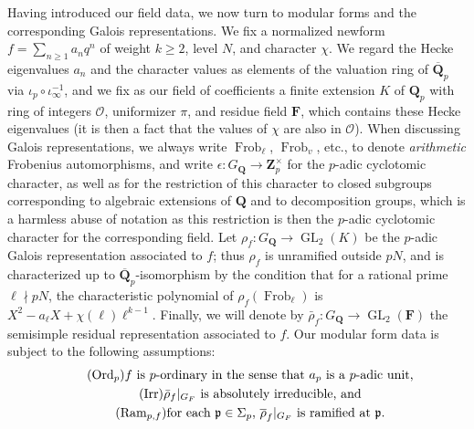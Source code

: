 \documentclass[12 pt]{amsart}
\theoremstyle{plain}
\theoremstyle{definition}
\numberwithin{equation}{section}
\numberwithin{table}{section}
\begin{document}
\indent Having introduced our field data, we now turn to modular forms and the corresponding Galois representations. We fix a normalized newform $f=\sum_{n\geq 1}a_nq^n$ of weight $k\geq 2$, level $N$, and character $\chi$. We regard the Hecke eigenvalues $a_n$ and the character values as elements of the valuation ring of $\overline{\mathbf{Q}}_p$ via $\iota_p\circ\iota_\infty^{-1}$, and we fix as our field of coefficients a finite extension $K$ of $\mathbf{Q}_p$ with ring of integers $\mathscr{O}$, uniformizer $\pi$, and residue field $\mathbf{F}$, which contains these Hecke eigenvalues (it is then a fact that the values of $\chi$ are also in $\mathscr{O}$). When discussing Galois representations, we always write $\operatorname{Frob}_\ell$, $\operatorname{Frob}_v$, etc., to denote \emph{arithmetic} Frobenius automorphisms, and write $\epsilon:G_\mathbf{Q}\to\mathbf{Z}_p^\times$ for the $p$-adic cyclotomic character, as well as for the restriction of this character to closed subgroups corresponding to algebraic extensions of $\mathbf{Q}$ and to decomposition groups, which is a harmless abuse of notation as this restriction is then the $p$-adic cyclotomic character for the corresponding field. Let $\rho_f:G_\mathbf{Q}\rightarrow\operatorname{GL}_2(K)$ be the $p$-adic Galois representation associated to $f$; thus $\rho_f$ is unramified outside $pN$, and is characterized up to $\overline{\mathbf{Q}}_p$-isomorphism by the condition that for a rational prime $\ell\nmid pN$, the characteristic polynomial of $\rho_f(\operatorname{Frob}_\ell)$ is $X^2-a_\ell X+\chi(\ell)\ell^{k-1}$. Finally, we will denote by $\bar{\rho}_f:G_\mathbf{Q}\rightarrow\operatorname{GL}_2(\mathbf{F})$ the semisimple residual representation associated to $f$. Our modular form data is subject to the following assumptions:
\begin{gather}
\label{Ord}\tag{Ord$_p$} \text{$f$ is $p$-ordinary in the sense that $a_p$ is a $p$-adic unit,}\\
\label{Irr} \tag{Irr}\text{$\bar{\rho}_f\vert_{G_F}$ is absolutely irreducible, and}\\
\label{Rampf}\tag{Ram$_{p,f}$}\text{for each $\mathfrak{p}\in\Sigma_p$, $\overline{\rho}_f\vert_{G_F}$ is ramified at $\mathfrak{p}$.}
\end{gather}
\end{document}
